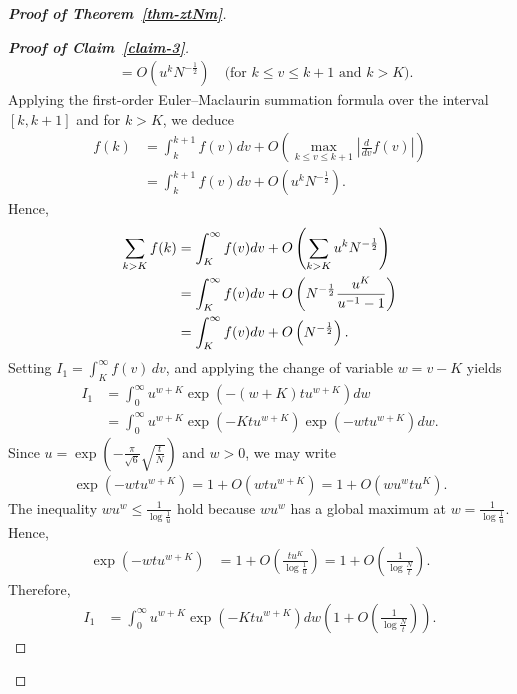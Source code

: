 \documentclass[11pt]{amsart}
\theoremstyle{plain}
\numberwithin{equation}{section}
\begin{document}
\begin{proof}[\textbf{\boldmath Proof of Theorem~\ref{thm-ztNm}}]
\begin{proof}[\textbf{\boldmath Proof of Claim~\ref{claim-3}}]
\begin{align*}
				&=O\left(u^{k}N^{-\frac{1}{2}}\right) \quad \text{(for $k\le v\le k+1$ and $k>K$).}
			\end{align*}
			Applying the first-order Euler--Maclaurin summation formula over the interval $[k, k+1]$ and for $k>K$, we deduce
			\begin{align*}
				f(k) &= \int_{k}^{k+1}f(v) dv + O\left( \max_{k \le v \le k+1} \left| \frac{d}{dv} f(v) \right| \right)\\
				&=\int_{k}^{k+1}f(v) dv + O\left(u^{k}N^{-\frac{1}{2}}\right).
			\end{align*}
			Hence,
			\begin{align}\label{eq-I1}
				\notag
				\sum_{k>K}f(k)&=\int_{K}^{\infty}f(v)dv+O\left(\sum_{k>K}u^{k}N^{-\frac{1}{2}}\right)\\
				\notag
				&=\int_{K}^{\infty}f(v)dv+O\left(N^{-\frac{1}{2}}\frac{u^{K}}{u^{-1}-1}\right) \\
				&=\int_{K}^{\infty}f(v)dv+O\left(N^{-\frac{1}{2}}\right). 
			\end{align}
			Setting $I_1 = \int_{K}^{\infty} f(v) \, dv$, and applying the change of variable $w=v-K$ yields
			\begin{align*}
				I_1&=\int_{0}^{\infty}u^{w+K}\exp\left(-(w+K)tu^{w+K}\right)dw \\
				&=\int_{0}^{\infty}u^{w+K}\exp\left(-Ktu^{w+K}\right)\exp\left(-wtu^{w+K}\right)dw. 
			\end{align*}
			Since $u=\exp\left(-\frac{\pi }{\sqrt{6}}\sqrt{\frac{t}{N}}\right)$ and $w>0$, we may write
			\begin{align*}
				\exp\left(-wtu^{w+K}\right)=1+O\left(wtu^{w+K}\right)=1+O\left(wu^{w}tu^{K}\right).
			\end{align*}
			The inequality $wu^{w}\le \frac{1}{\log \frac{1}{u}}$ hold because $wu^{w}$ has a global maximum at $w=\frac{1}{\log \frac{1}{u}}$. Hence,
			\begin{align*}
				\exp\left(-wtu^{w+K}\right)&= 1+O\left(\frac{tu^{K}}{\log \frac{1}{u}}\right)= 1+O\left(\frac{1}{\log \frac{N}{t}}\right).  
			\end{align*}
			Therefore,
			\begin{align*}
				I_1&=\int_{0}^{\infty}u^{w+K}\exp\left(-Ktu^{w+K}\right)dw\left(1+O\left(\frac{1}{\log \frac{N}{t}}\right)\right).    
			\end{align*}

\end{proof}
\end{proof}
\end{document}
